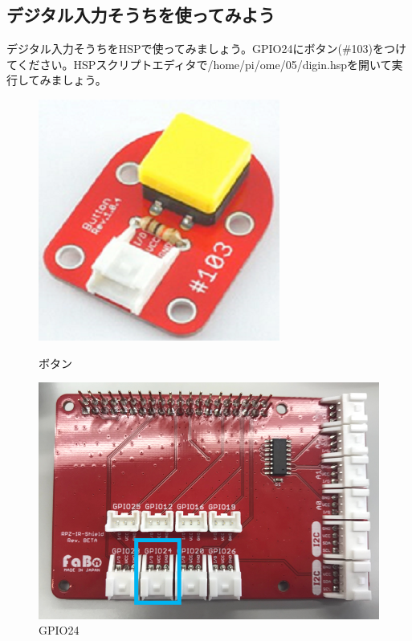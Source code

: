\subsection{デジタル入力そうちを使ってみよう}
デジタル入力そうちをHSPで使ってみましょう。GPIO24にボタン(\#103)をつけてください。HSPスクリプトエディタで/home/pi/ome/05/digin.hspを開いて実行してみましょう。\\
\begin{figure}[H]
  \begin{minipage}[t]{0.3\columnwidth}
    \centering
 \includegraphics[width=\linewidth]{images/chap05/text05-img028.png}
    \caption{ボタン}
  \end{minipage}
  \begin{minipage}[t]{0.5\columnwidth}
    \centering
    \includegraphics[width=\linewidth]{images/chap05/text05-img029.png}
    \caption{GPIO24}
  \end{minipage}
\end{figure}

